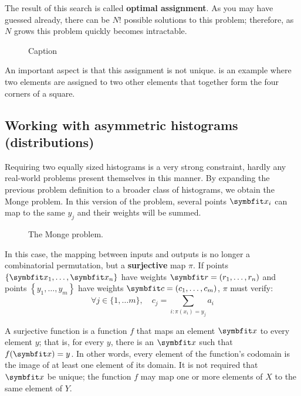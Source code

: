 The result of this search is called \textbf{optimal assignment}. As you may have guessed already, there can be $N!$ possible solutions to this problem; therefore, as $N$ grows this problem quickly becomes intractable.

\begin{figure}
    \centering
    
    \caption{Caption}
    \label{fig:ot-non-uniq}
\end{figure}

An important aspect is that this assignment is not unique.  is an example where two elements are assigned to two other elements that together form the four corners of a square.

\subsection{Working with asymmetric histograms (distributions)}\label{ssec:ot-assym}

Requiring two equally sized histograms is a very strong constraint, hardly any real-world problems present themselves in this manner. By expanding the previous problem definition to a broader class of histograms, we obtain the Monge problem. In this version of the problem, several points $\bfitx_i$ can map to the same $y_j$ and their weights will be summed.

\begin{figure}[ht]
    \centering
    
    \caption{The Monge problem.}
    \label{fig:ot-assym}
\end{figure}

In this case, the mapping between inputs and outputs is no longer a combinatorial permutation, but a \textbf{surjective} map $\pi$. If points $\{\bfitx_1, \ldots, \bfitx_n\}$ have weights $\bfitr=\left(r_1, \ldots, r_n\right)$ and points $\left\{y_1, \ldots, y_m\right\}$ have weights $\bfitc=\left(c_1, \ldots, c_m\right)$, $\pi$ must verify:
\begin{equation}
    \forall j \in\{1, \ldots m\}, \quad c_{j}=\sum_{i: \pi\left(x_{i}\right)=y_{j}} a_{i}
    \label{eqn:ot-mass-conserv}
\end{equation}

\begin{tcolorbox}[title=Surjective functions]
A surjective function is a function $f$ that maps an element $\bfitx$ to every element $y$; that is, for every $y$, there is an $\bfitx$ such that $f(\bfitx) = y$. In other words, every element of the function's codomain is the image of at least one element of its domain. It is not required that $\bfitx$ be unique; the function $f$ may map one or more elements of $X$ to the same element of $Y$. 
\end{tcolorbox}

